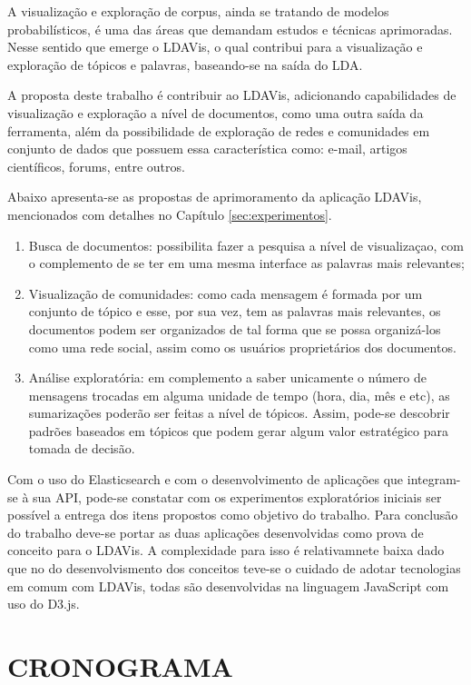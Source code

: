 \documentclass[12pt,a4paper]{article}
\begin{document}
A visualização e exploração de corpus, ainda se tratando de modelos probabilísticos, é uma das áreas que demandam estudos 
 e técnicas aprimoradas. Nesse sentido que emerge o LDAVis, o qual contribui para a visualização e exploração de tópicos e palavras,
 baseando-se na saída do LDA. 
 
 A proposta deste trabalho é contribuir ao LDAVis, adicionando capabilidades de visualização
 e exploração a nível de documentos, como uma outra saída da ferramenta, além da possibilidade de exploração de redes
 e comunidades em conjunto de dados que possuem essa característica como: e-mail, artigos científicos, forums, entre outros.

Abaixo apresenta-se as propostas de aprimoramento da aplicação LDAVis, mencionados com detalhes no Capítulo \ref{sec:experimentos}.

\begin{enumerate}
  \item Busca de documentos: possibilita fazer a pesquisa a nível de visualizaçao, com o complemento de se ter em uma mesma interface as palavras mais relevantes;
  \item Visualização de comunidades: 
   como cada mensagem é formada por um conjunto de tópico e esse, por sua vez, tem as palavras mais relevantes, os documentos podem ser organizados de tal forma que se possa organizá-los como uma rede social, assim como os usuários proprietários dos documentos.
  \item Análise exploratória: em complemento a saber unicamente o número de mensagens trocadas em alguma unidade de tempo (hora, dia, mês e etc), as sumarizações poderão ser feitas a nível de tópicos. Assim, pode-se descobrir padrões baseados em tópicos que podem gerar algum valor estratégico para tomada de decisão. 
\end{enumerate}


Com o uso do Elasticsearch e com o desenvolvimento de aplicações que integram-se à sua API, pode-se constatar com os experimentos exploratórios iniciais ser possível 
 a entrega dos itens propostos como objetivo do trabalho. Para conclusão do trabalho deve-se portar as duas aplicações
 desenvolvidas como prova de conceito para o LDAVis. A complexidade para isso é relativamnete baixa dado que  
 no do desenvolvismento dos conceitos teve-se o cuidado de adotar tecnologias em comum com LDAVis, todas são desenvolvidas
 na linguagem JavaScript com uso do D3.js.

\section{CRONOGRAMA} \label{sec:cronograma}
\end{document}
